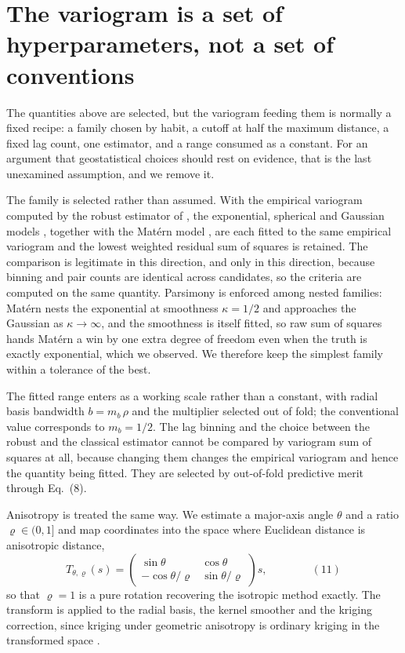 \documentclass[preprint,12pt,authoryear]{elsarticle}
\newcommand{\eqnum}[1]{\qquad\qquad\mathrm{(#1)}}
\begin{document}
\section{The variogram is a set of hyperparameters, not a set of conventions}
\label{sec:geohyper}

The quantities above are selected, but the variogram feeding them is normally a
fixed recipe: a family chosen by habit, a cutoff at half the maximum distance,
a fixed lag count, one estimator, and a range consumed as a constant. For an
argument that geostatistical choices should rest on evidence, that is the last
unexamined assumption, and we remove it.

The family is selected rather than assumed. With the empirical variogram
computed by the robust estimator of \citet{cressie1980}, the exponential,
spherical and Gaussian models \citep{matheron1963,journel1978}, together with
the Mat\'ern model \citep{matern1960,stein1999}, are
each fitted to the same empirical variogram and the lowest weighted residual sum
of squares is retained. The comparison is legitimate in this direction, and only
in this direction, because binning and pair counts are identical across
candidates, so the criteria are computed on the same quantity. Parsimony is
enforced among nested families: Mat\'ern nests the exponential at smoothness
$\kappa = 1/2$ and approaches the Gaussian as $\kappa \rightarrow \infty$, and
the smoothness is itself fitted, so raw sum of squares hands Mat\'ern a win by
one extra degree of freedom even when the truth is exactly exponential, which we
observed. We therefore keep the simplest family within a tolerance of the best.

The fitted range enters as a working scale rather than a constant, with radial
basis bandwidth $b = m_b\,\rho$ and the multiplier selected out of fold; the
conventional value corresponds to $m_b = 1/2$. The lag binning and the choice
between the robust and the classical \citep{matheron1963} estimator cannot be
compared by variogram sum of squares at all, because changing them changes the
empirical variogram and hence the quantity being fitted. They are selected by
out-of-fold predictive merit through Eq.~(8).

Anisotropy is treated the same way. We estimate a major-axis angle $\theta$ and
a ratio $\varrho \in (0,1]$ and map coordinates into the space where Euclidean
distance is anisotropic distance,
\[
T_{\theta,\varrho}(s) =
\begin{pmatrix}
\sin\theta & \cos\theta \\[2pt]
-\cos\theta/\varrho & \sin\theta/\varrho
\end{pmatrix} s ,
\eqnum{11}
\]
so that $\varrho = 1$ is a pure rotation recovering the isotropic method
exactly. The transform is applied to the radial basis, the kernel smoother and
the kriging correction, since kriging under geometric anisotropy is ordinary
kriging in the transformed space \citep{journel1978}.
\end{document}
